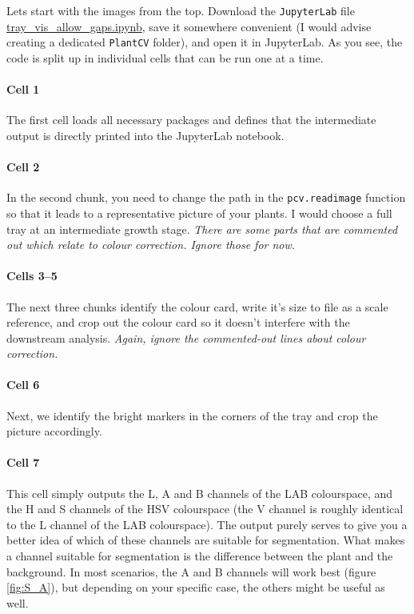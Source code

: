 \documentclass[10pt]{article}
\begin{document}
Lets start with the images from the top. Download the \texttt{JupyterLab} file \href{https://github.com/leonardblaschek/plantcv/blob/master/tray_vis_allow_gaps.ipynb}{tray\_vis\_allow\_gaps.ipynb}, save it somewhere convenient (I would advise creating a dedicated \texttt{PlantCV} folder), and open it in JupyterLab. As you see, the code is split up in individual cells that can be run one at a time. 

\paragraph*{Cell 1} The first cell loads all necessary packages and defines that the intermediate output is directly printed into the JupyterLab notebook.

\paragraph*{Cell 2} In the second chunk, you need to change the path in the \texttt{pcv.readimage} function so that it leads to a representative picture of your plants. I would choose a full tray at an intermediate growth stage. \textit{There are some parts that are commented out which relate to colour correction. Ignore those for now.}

\paragraph*{Cells 3--5} The next three chunks identify the colour card, write it's size to file as a scale reference, and crop out the colour card so it doesn't interfere with the downstream analysis. \textit{Again, ignore the commented-out lines about colour correction.}

\paragraph*{Cell 6} Next, we identify the bright markers in the corners of the tray and crop the picture accordingly.

\paragraph*{Cell 7} This cell simply outputs the L, A and B channels of the LAB colourspace, and the H and S channels of the HSV colourspace (the V channel is roughly identical to the L channel of the LAB colourspace). The output purely serves to give you a better idea of which of these channels are suitable for segmentation. What makes a channel suitable for segmentation is the difference between the plant and the background. In most scenarios, the A and B channels will work best (figure \ref{fig:S_A}), but depending on your specific case, the others might be useful as well.
\end{document}
